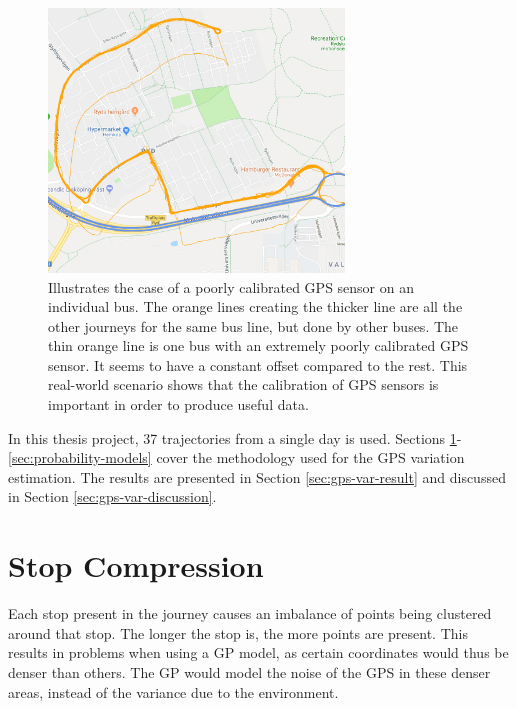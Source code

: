 \begin{figure}[ht!]
    \centering
    \includegraphics[width=0.7\textwidth]{figures/gps_sensor_calibration}
    \caption[Illustrates the case of a poorly calibrated GPS sensor on an individual bus]
    {\small Illustrates the case of a poorly calibrated GPS sensor on an individual bus.
    The orange lines creating the thicker line are all the other journeys for the same bus line, but done by other buses.
    The thin orange line is one bus with an extremely poorly calibrated GPS sensor.
    It seems to have a constant offset compared to the rest.
    This real-world scenario shows that the calibration of GPS sensors is important in order to produce useful data.}
    \label{fig:gps-sensor-calibration}
\end{figure}

In this thesis project, 37 trajectories from a single day is used.
Sections \ref{sec:stop-compression}-\ref{sec:probability-models} cover the methodology used for the GPS variation estimation.
The results are presented in Section \ref{sec:gps-var-result} and discussed in Section \ref{sec:gps-var-discussion}.  

\section{Stop Compression} \label{sec:stop-compression}
Each stop present in the journey causes an imbalance of points being clustered around that stop.
The longer the stop is, the more points are present.
This results in problems when using a GP model, as certain coordinates would thus be denser than others.
The GP would model the noise of the GPS in these denser areas, instead of the variance due to the environment.

